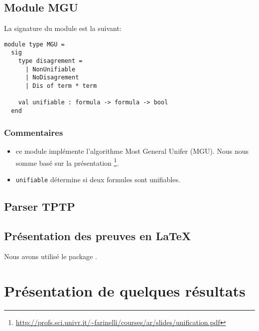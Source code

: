 \documentclass[12pt]{article}
\begin{document}
\subsection{Module MGU}
La signature du module est la suivant:
\begin{lstlisting}[basicstyle=\small]
module type MGU =
  sig
    type disagrement =
      | NonUnifiable
      | NoDisagrement
      | Dis of term * term

    val unifiable : formula -> formula -> bool
  end

\end{lstlisting}

\subsubsection*{Commentaires}
\begin{itemize}
\item ce module implémente l'algorithme Most General Unifer (MGU). Nous nous somme basé sur la présentation \footnote{\url{http://profs.sci.univr.it/~farinelli/courses/ar/slides/unification.pdf}}.
\item \verb?unifiable? détermine si deux formules sont unifiables.
\end{itemize}


\subsection{Parser TPTP}


\subsection{Présentation des preuves en LaTeX}
Nous avons utilisé le package .

\section{Présentation de quelques résultats}
\end{document}
